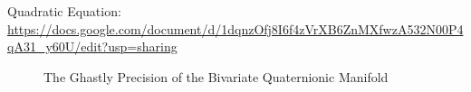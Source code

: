 Quadratic Equation:\\
\url{https://docs.google.com/document/d/1dqnzOfj8I6f4zVrXB6ZnMXfwzA532N00P4qA31_y60U/edit?usp=sharing}
\begin{figure}[bp!]
\begin{center}
\caption{The Ghastly Precision of the Bivariate Quaternionic Manifold}
\noindent{}
\end{center}
\end{figure}
